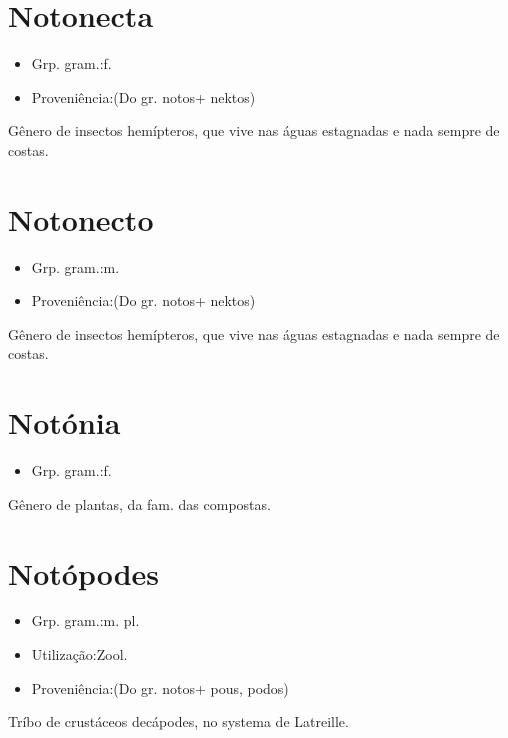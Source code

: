 \section{Notonecta}
\begin{itemize}
\item {Grp. gram.:f.}
\end{itemize}
\begin{itemize}
\item {Proveniência:(Do gr. \textunderscore notos\textunderscore  + \textunderscore nektos\textunderscore )}
\end{itemize}
Gênero de insectos hemípteros, que vive nas águas estagnadas e nada sempre de costas.
\section{Notonecto}
\begin{itemize}
\item {Grp. gram.:m.}
\end{itemize}
\begin{itemize}
\item {Proveniência:(Do gr. \textunderscore notos\textunderscore  + \textunderscore nektos\textunderscore )}
\end{itemize}
Gênero de insectos hemípteros, que vive nas águas estagnadas e nada sempre de costas.
\section{Notónia}
\begin{itemize}
\item {Grp. gram.:f.}
\end{itemize}
Gênero de plantas, da fam. das compostas.
\section{Notópodes}
\begin{itemize}
\item {Grp. gram.:m. pl.}
\end{itemize}
\begin{itemize}
\item {Utilização:Zool.}
\end{itemize}
\begin{itemize}
\item {Proveniência:(Do gr. \textunderscore notos\textunderscore  + \textunderscore pous\textunderscore , \textunderscore podos\textunderscore )}
\end{itemize}
Tríbo de crustáceos decápodes, no systema de Latreille.
